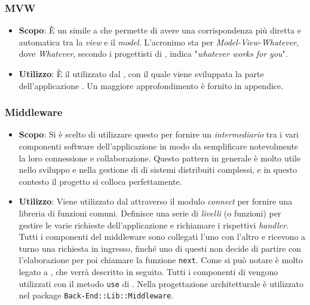 \subsubsection{MVW}

\begin{itemize}

	\item \textbf{Scopo}: È un  simile a  che permette di avere una corrispondenza più diretta e automatica tra la \textit{view} e il \textit{model}. L'acronimo  sta per \textit{Model-View-Whatever}, dove \textit{Whatever}, secondo i progettisti di , indica "\textit{whatever works for you}".
	\item \textbf{Utilizzo}: È il  utilizzato dal  , con il quale viene sviluppata la parte  dell'applicazione . Un maggiore approfondimento è fornito in appendice.

\end{itemize}

\subsubsection{Middleware} 

\begin{itemize}

	\item \textbf{Scopo}: Si è scelto di utilizzare questo  per fornire un \textit{intermediario} tra i vari componenti software dell'applicazione in modo da semplificare notevolmente la loro connessione e collaborazione. Questo pattern in generale è molto utile nello sviluppo e nella gestione di di sistemi distribuiti complessi, e in questo contesto il progetto  si colloca perfettamente.
	\item \textbf{Utilizzo}: Viene utilizzato dal   attraverso il modulo \textit{connect} per fornire una libreria di funzioni comuni. Definisce una serie di \textit{livelli} (o funzioni) per gestire le varie richieste dell'applicazione e richiamare i rispettivi \textit{handler}. Tutti i componenti del middleware sono collegati l'uno con l'altro e ricevono a turno una richiesta in ingresso, finché uno di questi non decide di partire con l'elaborazione per poi chiamare la funzione \texttt{next}. Come si può notare è molto legato a , che verrà descritto in seguito. Tutti i componenti di  vengono utilizzati con il metodo \texttt{use} di . Nella progettazione architetturale è utilizzato nel package \texttt{Back-End::Lib::Middleware}.

\end{itemize}

